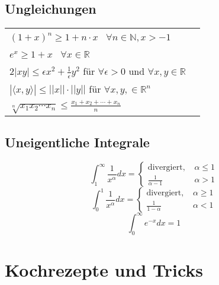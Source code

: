 \documentclass[a4paper,10pt]{article}
\begin{document}
\subsection{Ungleichungen}
\begin{center}
  \begin{tabularx}{\linewidth}{>{\centering\arraybackslash}X>{\centering\arraybackslash}X}
    $(1+x)^n \geq 1+ n\cdot x$ \, $\forall n\in \mathbb{N}, x > -1$\\
    $e^x \geq 1 + x$ \, $\forall x\in \mathbb{R}$\\
    $2|xy| \leq \epsilon x^2 + \frac{1}{\epsilon} y^2$ für $\forall \epsilon > 0$ und $\forall x,y \in \mathbb{R}$\\
    $|\langle x,y \rangle| \leq ||x|| \cdot ||y||$ für $\forall x,y, \in \mathbb{R}^n$\\
    $\sqrt[n]{x_1 x_2 \cdots x_n} \leq \frac{x_1 + x_2 + \cdots + x_n}{n}$
  \end{tabularx}
\end{center}

\subsection{Uneigentliche Integrale}
$$\int_1^\infty \frac{1}{x^\alpha} dx = \begin{cases}
  \text{divergiert, } & \alpha \leq 1\\
  \frac{1}{\alpha - 1} & \alpha > 1
\end{cases}$$
$$\int_0^1 \frac{1}{x^\alpha} dx = \begin{cases}
  \text{divergiert, } & \alpha \geq 1\\
  \frac{1}{1- \alpha} & \alpha < 1
\end{cases}$$
$$\int_0^\infty e^{-x}dx = 1$$

\section{Kochrezepte und Tricks}
\end{document}

